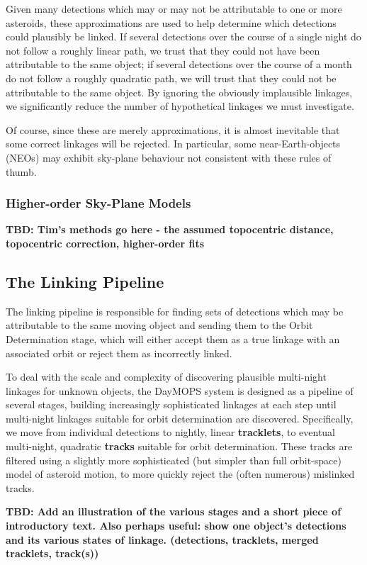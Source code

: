 Given many detections which may or may not be attributable to one or
more asteroids, these approximations are used to help determine which
detections could plausibly be linked.  If several detections over the
course of a single night do not follow a roughly linear path, we trust
that they could not have been attributable to the same object; if
several detections over the course of a month do not follow a roughly
quadratic path, we will trust that they could not be attributable to
the same object.  By ignoring the obviously implausible linkages, we
significantly reduce the number of hypothetical linkages we must
investigate.

Of course, since these are merely approximations, it is almost
inevitable that some correct linkages will be rejected.  In
particular, some near-Earth-objects (NEOs) may exhibit sky-plane
behaviour not consistent with these rules of thumb.


\subsubsection{Higher-order Sky-Plane Models}
\textbf{TBD: Tim's methods go here - the assumed topocentric distance, topocentric correction, higher-order fits}


\subsection{The Linking Pipeline}
The linking pipeline is responsible for finding sets of detections
which may be attributable to the same moving object and sending them
to the Orbit Determination stage, which will either accept them as a
true linkage with an associated orbit or reject them as incorrectly
linked.  

To deal with the scale and complexity of discovering plausible
multi-night linkages for unknown objects, the DayMOPS system is
designed as a pipeline of several stages, building increasingly
sophisticated linkages at each step until multi-night linkages
suitable for orbit determination are discovered.  Specifically, we
move from individual detections to nightly, linear \textbf{tracklets},
to eventual multi-night, quadratic \textbf{tracks} suitable for orbit
determination.  These tracks are filtered using a slightly more
sophisticated (but simpler than full orbit-space) model of asteroid
motion, to more quickly reject the (often numerous) mislinked tracks.


\textbf{TBD: Add an illustration of the various stages and a short piece of
introductory text.  Also perhaps useful: show one object's detections and its various states of linkage. (detections, tracklets, merged tracklets, track(s))}


